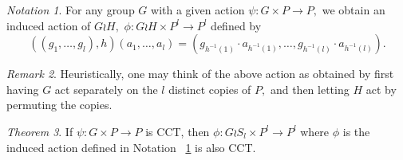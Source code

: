 \documentclass[10 pt]{amsart}
\theoremstyle{plain}
\theoremstyle{definition}
\theoremstyle{remark}
\numberwithin{equation}{section}
\newtheorem{thm}{Theorem}[section]
\theoremstyle{remark}
\newtheorem{rem}[thm]{Remark}
\newtheorem{note}[thm]{Notation}
\begin{document}
\begin{note}
\label{note:wreath_action}
For any group $G$ with a given action $\psi:G\times P \rightarrow P,$ we obtain an induced action of $G \wr H,$ $\phi:G \wr H \times P^l \rightarrow P^l$ defined by 
$$((g_1,\ldots, g_l),h)(a_1,\ldots, a_l) = (g_{h^{-1}(1)}\cdot a_{h^{-1}(1)},\ldots,g_{h^{-1}(l)} \cdot a_{h^{-1}(l)}).$$
\end{note}

\begin{rem}
Heuristically, one may think of the above action as obtained by first having $G$ act separately on the $l$ distinct copies of $P,$ and then letting $H$ act by permuting the copies.
\end{rem}

\begin{thm}
\label{thm:wreath_preservation}
If $\psi:G\times P \rightarrow P$ is CCT, then $\phi:G\wr S_l \times P^l \rightarrow P^l$ where $\phi$ is the induced action defined in Notation ~\ref{note:wreath_action} is also CCT.
\end{thm}
\end{document}
